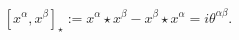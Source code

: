\begin{equation}\label{cr1}
 [x^{\alpha},x^{\beta}]_{\star}:=
x^{\alpha}\star x^{\beta}-x^{\beta}\star x^{\alpha}
 =i\theta^{\alpha\beta}.
\end{equation}

